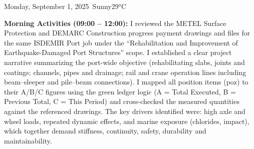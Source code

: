 \begin{dailyentry}{Monday, September 1, 2025}{\weathersunny\ Sunny}{29°C}

\begin{workcontent}
\textbf{Morning Activities (09:00 – 12:00):} I reviewed the METEL Surface Protection and DEMARC Construction progress payment drawings and files for the same ISDEMIR Port job under the “Rehabilitation and Improvement of Earthquake-Damaged Port Structures” scope. I established a clear project narrative summarizing the port-wide objective (rehabilitating slabs, joints and coatings; channels, pipes and drainage; rail and crane operation lines including beam–sleeper and pile–beam connections). I mapped all position items (poz) to their A/B/C figures using the green ledger logic (A = Total Executed, B = Previous Total, C = This Period) and cross-checked the measured quantities against the referenced drawings. The key drivers identified were: high axle and wheel loads, repeated dynamic effects, and marine exposure (chlorides, impact), which together demand stiffness, continuity, safety, durability and maintainability.


\end{workcontent}
\end{dailyentry}
